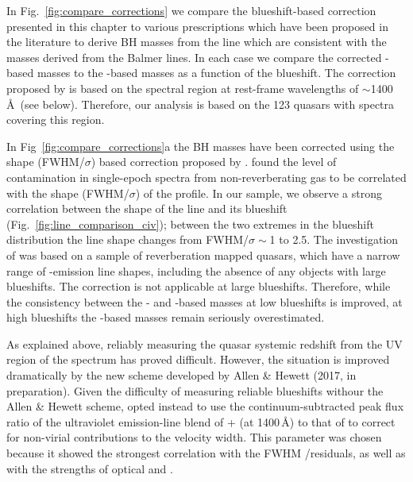 In Fig.~\ref{fig:compare_corrections} we compare the  blueshift-based correction presented in this chapter to various prescriptions which have been proposed in the literature to derive BH masses from the  line which are consistent with the masses derived from the Balmer lines. 
In each case we compare the corrected -based masses to the \hans-based masses as a function of the  blueshift. 
The correction proposed by \citet{runnoe13} is based on the spectral region at rest-frame wavelengths of $\sim$1400\,\AA \ (see below). 
Therefore, our analysis is based on the 123 quasars with spectra covering this region. 

In Fig~\ref{fig:compare_corrections}a the  BH masses have been corrected using the  shape (FWHM/$\sigma$) based correction proposed by \citet{denney12}. 
\citet{denney12} found the level of contamination in single-epoch spectra from non-reverberating gas to be correlated with the shape (FWHM/$\sigma$) of the  profile. 
In our sample, we observe a strong correlation between the shape of the  line and its blueshift (Fig.~\ref{fig:line_comparison_civ}); between the two extremes in the  blueshift distribution the line shape changes from FWHM/$\sigma\sim$1 to 2.5. 
The investigation of \citet{denney12} was based on a sample of reverberation mapped quasars, which have a narrow range of -emission line shapes, including the absence of any objects with large  blueshifts. 
The correction is not applicable at large  blueshifts. 
Therefore, while the consistency between the \hans- and -based masses at low  blueshifts is improved, at high  blueshifts the -based masses remain seriously overestimated.

As explained above, reliably measuring the quasar systemic redshift from the UV region of the spectrum has proved difficult. 
However, the situation is improved dramatically by the new scheme developed by Allen \& Hewett (2017, in preparation). 
Given the difficulty of measuring reliable  blueshifts withour the Allen \& Hewett scheme, \citet{runnoe13} opted instead to use the continuum-subtracted peak flux ratio of the ultraviolet emission-line blend of + (at 1400\,\AA) to that of  to correct for non-virial contributions to the  velocity width. 
This parameter was chosen because it showed the strongest correlation with the FWHM /\hb residuals, as well as with the strengths of optical  and . 

